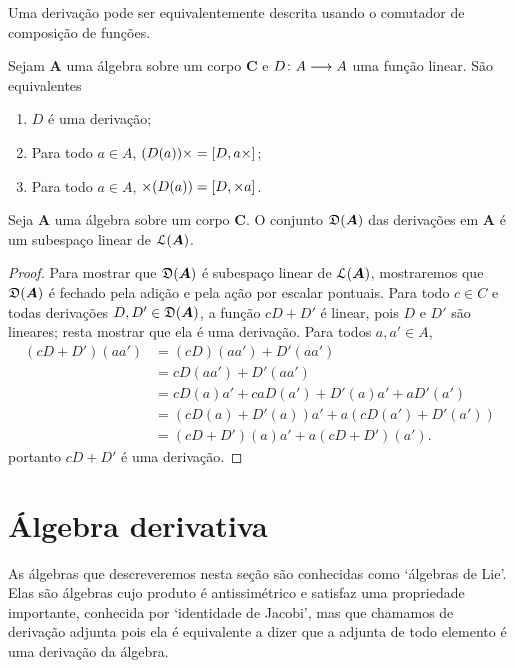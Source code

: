 Uma derivação pode ser equivalentemente descrita usando o comutador de composição de funções.

\begin{exercise}
Sejam $\bm A$ uma álgebra sobre um corpo $\bm C$ e ${D}\colon {A} \longrightarrow {A}$ uma função linear. São equivalentes
	\begin{enumerate}
	\item $D$ é uma derivação;
	\item Para todo $a \in A$, $(D(a))\times = \left[{D},{a \times}\right]$;
	\item Para todo $a \in A$, $\times(D(a)) = \left[{D},{\times a}\right]$.
	\end{enumerate}
\end{exercise}

\begin{proposition}
\label{prop:algebra.derivacao.subespaco}
Seja $\bm A$ uma álgebra sobre um corpo $\bm C$. O conjunto $\mathfrak{D}(\bm A)$ das derivações em $\bm A$ é um subespaço linear de $\mathcal{L}(\bm A)$.
\end{proposition}
\begin{proof}
Para mostrar que $\mathfrak{D}(\bm A)$ é subespaço linear de $\mathcal{L}(\bm A)$, mostraremos que $\mathfrak{D}(\bm A)$ é fechado pela adição e pela ação por escalar pontuais. Para todo $c \in C$ e todas derivações $D,D' \in \mathfrak{D}(\bm A)$, a função $cD+D'$ é linear, pois $D$ e $D'$ são lineares; resta mostrar que ela é uma derivação. Para todos $a,a' \in A$,
	\begin{align*}
	(cD+D')(aa') &= (cD)(aa') + D'(aa') \\
		&= cD(aa') + D'(aa') \\
		&= cD(a)a' + caD(a') + D'(a)a' + aD'(a') \\
		&= (cD(a)+D'(a))a' + a(cD(a')+D'(a')) \\
		&= (cD+D')(a)a' + a(cD+D')(a').
	\end{align*}
portanto $cD+D'$ é uma derivação.
\end{proof}



\section{Álgebra derivativa}

As álgebras que descreveremos nesta seção são conhecidas como `álgebras de Lie'. Elas são álgebras cujo produto é antissimétrico e satisfaz uma propriedade importante, conhecida por `identidade de Jacobi', mas que chamamos de derivação adjunta pois ela é equivalente a dizer que a adjunta de todo elemento é uma derivação da álgebra.

